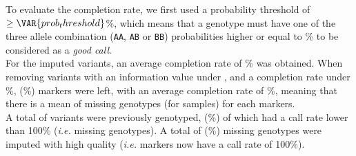 
To evaluate the completion rate, we first used a probability threshold of
$\geq \VAR{ prob_threshold }$\%, which means that a genotype must have one of
the three allele combination (\texttt{AA}, \texttt{AB} or \texttt{BB})
probabilities higher or equal to \% to be considered as a
\textit{good call}.\\

For the  imputed variants, an average completion rate of
\% was obtained. When removing variants with an
information value under , and a completion rate under
\%,  (\%)
markers were left, with an average completion rate of
\%, meaning that there is a mean of
 missing genotypes (for  samples) for
each markers.\\

A total of  variants were previously genotyped,
 (\%) of
which had  a call rate lower than 100\% (\textit{i.e.} 
missing genotypes). A total of 
(\%) missing genotypes were imputed with high
quality (\textit{i.e.}  markers now have a call
rate of 100\%).

